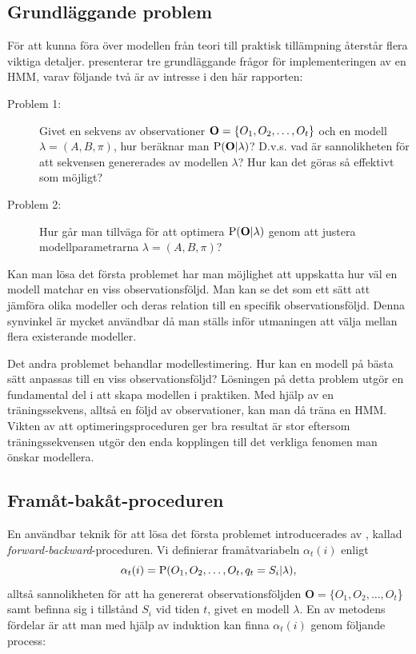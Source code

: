 \documentclass[../rapport_MVEX01-11-05]{subfiles}
\begin{document}
\subsection{Grundläggande problem}
För att kunna föra över modellen från teori till praktisk tillämpning
återstår flera viktiga detaljer.  presenterar
tre grundläggande frågor för implementeringen av en HMM, varav följande
två är av intresse i den här rapporten:
\begin{description}
\item[Problem 1:] Givet en sekvens av observationer
  $\mathbf{O}=\{O_1,O_2,\dots,O_t\}$ och en modell $\lambda = (A,B,\pi)$, hur
  beräknar man $\mathrm{P}(\mathbf{O}|\lambda)$? D.v.s. vad är sannolikheten för att
  sekvensen genererades av modellen $\lambda$? Hur kan
  det göras så effektivt som möjligt?
\item[Problem 2:] Hur går man tillväga för att optimera
  $\mathrm{P}(\mathbf{O}|\lambda)$ genom att justera
  modellparametrarna $\lambda = (A,B,\pi)$? 
\end{description}

Kan man lösa det första problemet har man möjlighet att uppskatta hur
väl en modell matchar en viss observationsföljd. Man kan se det som
ett sätt att jämföra olika modeller och
deras relation till en specifik observationsföljd. Denna synvinkel är
mycket användbar då man ställs inför utmaningen att välja mellan
flera existerande modeller. 

Det andra problemet behandlar modellestimering. Hur kan en modell
på bästa sätt anpassas till en viss observationsföljd?
Lösningen på detta problem utgör en fundamental del i
att skapa modellen i  praktiken.
Med hjälp av en träningssekvens, alltså en följd av
observationer, kan man då träna en HMM. Vikten av att
optimeringsproceduren ger bra resultat är stor eftersom
träningssekvensen utgör den enda kopplingen till det verkliga fenomen
man önskar modellera.      

\subsection{Framåt-bakåt-proceduren}
En användbar teknik för att lösa det första problemet introducerades av , kallad
\emph{forward-backward}-proceduren. Vi
definierar framåtvariabeln $\alpha_t(i)$ enligt
\begin{equation*}
\alpha_t(i) = \mathrm{P}(O_1,O_2,\dots,O_t,q_t = S_i | \lambda),
\end{equation*}
alltså sannolikheten för att ha genererat observationsföljden $\textbf{O}
= \{O_1,O_2,\dots,O_t$\} samt befinna sig i tillstånd $S_i$ vid tiden
$t$, givet en modell $\lambda$. En av metodens fördelar är att man med
hjälp av induktion kan finna $\alpha_t(i)$ genom följande process:
\end{document}
